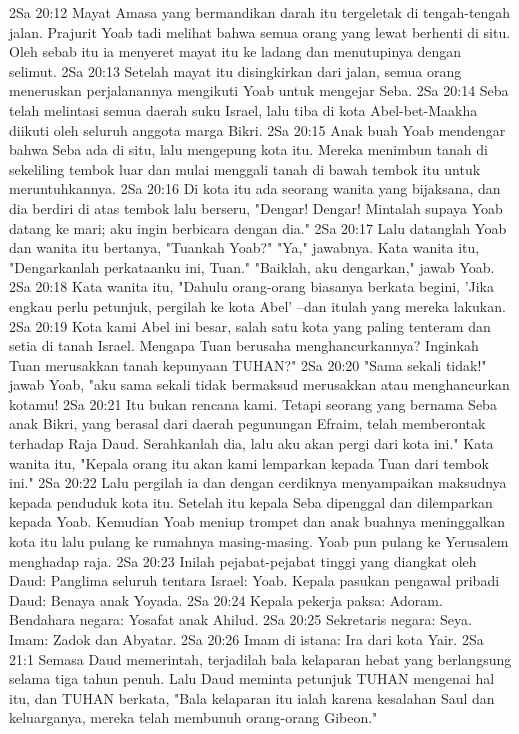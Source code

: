 2Sa 20:12  Mayat Amasa yang bermandikan darah itu tergeletak di tengah-tengah jalan. Prajurit Yoab tadi melihat bahwa semua orang yang lewat berhenti di situ. Oleh sebab itu ia menyeret mayat itu ke ladang dan menutupinya dengan selimut.
2Sa 20:13  Setelah mayat itu disingkirkan dari jalan, semua orang meneruskan perjalanannya mengikuti Yoab untuk mengejar Seba.
2Sa 20:14  Seba telah melintasi semua daerah suku Israel, lalu tiba di kota Abel-bet-Maakha diikuti oleh seluruh anggota marga Bikri.
2Sa 20:15  Anak buah Yoab mendengar bahwa Seba ada di situ, lalu mengepung kota itu. Mereka menimbun tanah di sekeliling tembok luar dan mulai menggali tanah di bawah tembok itu untuk meruntuhkannya.
2Sa 20:16  Di kota itu ada seorang wanita yang bijaksana, dan dia berdiri di atas tembok lalu berseru, "Dengar! Dengar! Mintalah supaya Yoab datang ke mari; aku ingin berbicara dengan dia."
2Sa 20:17  Lalu datanglah Yoab dan wanita itu bertanya, "Tuankah Yoab?" "Ya," jawabnya. Kata wanita itu, "Dengarkanlah perkataanku ini, Tuan." "Baiklah, aku dengarkan," jawab Yoab.
2Sa 20:18  Kata wanita itu, "Dahulu orang-orang biasanya berkata begini, 'Jika engkau perlu petunjuk, pergilah ke kota Abel' --dan itulah yang mereka lakukan.
2Sa 20:19  Kota kami Abel ini besar, salah satu kota yang paling tenteram dan setia di tanah Israel. Mengapa Tuan berusaha menghancurkannya? Inginkah Tuan merusakkan tanah kepunyaan TUHAN?"
2Sa 20:20  "Sama sekali tidak!" jawab Yoab, "aku sama sekali tidak bermaksud merusakkan atau menghancurkan kotamu!
2Sa 20:21  Itu bukan rencana kami. Tetapi seorang yang bernama Seba anak Bikri, yang berasal dari daerah pegunungan Efraim, telah memberontak terhadap Raja Daud. Serahkanlah dia, lalu aku akan pergi dari kota ini." Kata wanita itu, "Kepala orang itu akan kami lemparkan kepada Tuan dari tembok ini."
2Sa 20:22  Lalu pergilah ia dan dengan cerdiknya menyampaikan maksudnya kepada penduduk kota itu. Setelah itu kepala Seba dipenggal dan dilemparkan kepada Yoab. Kemudian Yoab meniup trompet dan anak buahnya meninggalkan kota itu lalu pulang ke rumahnya masing-masing. Yoab pun pulang ke Yerusalem menghadap raja.
2Sa 20:23  Inilah pejabat-pejabat tinggi yang diangkat oleh Daud: Panglima seluruh tentara Israel: Yoab. Kepala pasukan pengawal pribadi Daud: Benaya anak Yoyada.
2Sa 20:24  Kepala pekerja paksa: Adoram. Bendahara negara: Yosafat anak Ahilud.
2Sa 20:25  Sekretaris negara: Seya. Imam: Zadok dan Abyatar.
2Sa 20:26  Imam di istana: Ira dari kota Yair.
2Sa 21:1  Semasa Daud memerintah, terjadilah bala kelaparan hebat yang berlangsung selama tiga tahun penuh. Lalu Daud meminta petunjuk TUHAN mengenai hal itu, dan TUHAN berkata, "Bala kelaparan itu ialah karena kesalahan Saul dan keluarganya, mereka telah membunuh orang-orang Gibeon."
